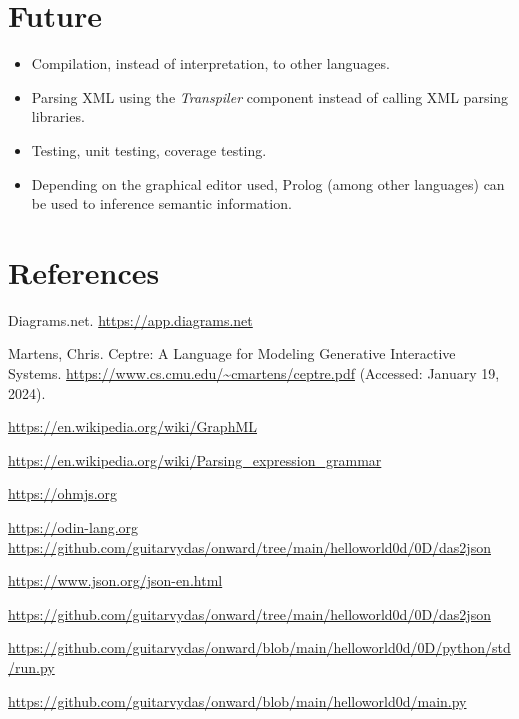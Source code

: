 \documentclass[10pt]{acmart}
\begin{document}
\section{Future}
\begin{itemize}
\item Compilation, instead of interpretation, to other languages.

\item Parsing XML using the \emph{Transpiler} component instead of calling XML parsing libraries.

\item Testing, unit testing, coverage testing.

\item Depending on the graphical editor used, Prolog (among other languages)
can be used to inference semantic information.
\end{itemize}

\section{References}

\begin{thebibliography}{9}

Diagrams.net.
\url{https://app.diagrams.net}

Martens, Chris. Ceptre: A Language for Modeling Generative Interactive Systems. \url{https://www.cs.cmu.edu/~cmartens/ceptre.pdf} (Accessed: January 19, 2024).

\url{https://en.wikipedia.org/wiki/GraphML}

\url{https://en.wikipedia.org/wiki/Parsing_expression_grammar}

\url{https://ohmjs.org}

\url{https://odin-lang.org}
\url{https://github.com/guitarvydas/onward/tree/main/helloworld0d/0D/das2json}

\url{https://www.json.org/json-en.html}

\url{https://github.com/guitarvydas/onward/tree/main/helloworld0d/0D/das2json}

\url{https://github.com/guitarvydas/onward/blob/main/helloworld0d/0D/python/std/run.py}

\url{https://github.com/guitarvydas/onward/blob/main/helloworld0d/main.py}

\end{thebibliography}
\end{document}
